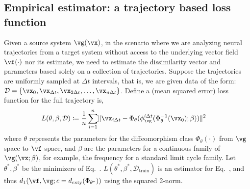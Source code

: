 \documentclass{article}
\theoremstyle{definition} \newtheorem{definition}{Definition}  \newtheorem{example}{Example}
\theoremstyle{remark} \newtheorem{remark}{Remark}
\renewcommand{\eqref}{Eq.~\originaleqref}
\newcounter{ct}
\DeclarePairedDelimiter{\norm}{\lVert}{\rVert}
\newcommand{\inv}{^{-1}}
\newcommand{\dcomplexity}{\ensuremath{d_\text{cxty}}}
\newcommand{\homeo}{\Phi} %
\newcommand{\invhomeo}{\homeo\inv}
\begin{document}
\subsection{Empirical estimator: a trajectory based loss function}\label{sec:loss}
Given a source system $\vg(\vx)$, in the scenario where we are analyzing neural trajectories from a target system without access to the underlying vector field $\vf(\cdot)$ nor its estimate, we need to estimate the dissimilarity vector and parameters based solely on a collection of trajectories.
Suppose the trajectories are uniformly sampled at $\Delta t$ intervals, that is, we are given data of the form:
$\mathcal{D} = \{ \vx_0, \vx_{\Delta t}, \vx_{2\Delta t}, \ldots, \vx_{n \Delta t}\}$.
Define a (mean squared error) loss function for the full trajectory is,
\begin{align}\label{eq:loss}
    L(\theta, \beta, \mathcal{D}) &\coloneq \frac{1}{n} \sum_{i=1}^n
	\norm{\vx_{i\Delta t} - \homeo_\theta(\phi_\vg^{i\Delta t}(\invhomeo_\theta(\vx_0); \beta))}^2
\end{align}
where $\theta$ represents the parameters for the diffeomorphism class $\homeo_\theta(\cdot)$ from $\vg$ space to $\vf$ space,
and $\beta$ are the parameters for a continuous family of $\vg(\vx; \beta)$, for example, the frequency for a standard limit cycle family.
Let $\theta^\ast, \beta^\ast$ be the minimizers of \eqref{eq:loss}.
$L(\theta^\ast, \beta^\ast, \mathcal{D}_{\text{train}})$ is 
an estimator for \eqref{eq:ed1}, and thus $\bar{d}_1(\vf, \vg; c = \dcomplexity(\homeo_{\theta^\ast}))$ using the squared 2-norm.

\end{document}
